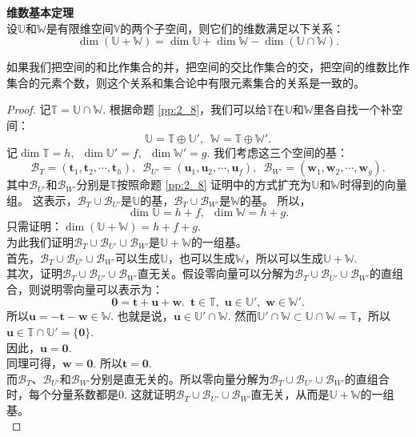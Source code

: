 \documentclass[12pt,UTF8]{ctexbook}
\begin{document}
\begin{pp}\textbf{维数基本定理}\label{pp:2_13}\\
    设$\mathbb{U}$和$\mathbb{W}$是有限维空间$\mathbb{V}$的两个子空间，则它们的维数满足以下关系：
    $$ \dim (\mathbb{U} + \mathbb{W}) = \dim \mathbb{U} + \dim \mathbb{W} - \dim (\mathbb{U} \cap \mathbb{W}).$$
\end{pp}
如果我们把空间的和比作集合的并，把空间的交比作集合的交，把空间的维数比作集合的元素个数，则这个关系和集合论中有限元素集合的关系是一致的。
\begin{proof} %
    记$\mathbb{T} = \mathbb{U} \cap \mathbb{W}$. 根据命题 \ref{pp:2_8}，我们可以给$\mathbb{T}$在$\mathbb{U}$和$\mathbb{W}$里各自找一个补空间：
    $$ \mathbb{U} = \mathbb{T} \oplus \mathbb{U}', \,\,\, \mathbb{W} = \mathbb{T} \oplus \mathbb{W}'.$$
    记$\dim \mathbb{T} = h, \,\,\, \dim \mathbb{U}' = f, \,\,\, \dim \mathbb{W}' = g$. 我们考虑这三个空间的基：
    $$ \mathcal{B}_T = (\mathbf{t}_1, \mathbf{t}_2, \cdots, \mathbf{t}_h), \,\,\, \mathcal{B}_{U'} = (\mathbf{u}_1, \mathbf{u}_2, \cdots, \mathbf{u}_f), \,\,\, \mathcal{B}_{W'} = (\mathbf{w}_1, \mathbf{w}_2, \cdots, \mathbf{w}_g). $$  
    其中$\mathcal{B}_{U'}$和$\mathcal{B}_{W'}$分别是$\mathbb{T}$按照命题 \ref{pp:2_8} 证明中的方式扩充为$\mathbb{U}$和$\mathbb{W}$时得到的向量组。
    这表示，$\mathcal{B}_T\cup\mathcal{B}_{U'}$是$\mathbb{U}$的基，$\mathcal{B}_T\cup\mathcal{B}_{W'}$是$\mathbb{W}$的基。
    所以，
    $$\dim \mathbb{U} = h + f,\,\,\,\dim \mathbb{W} = h + g.$$
    只需证明：$ \dim (\mathbb{U} + \mathbb{W}) = h + f + g.$\\
    为此我们证明$\mathcal{B}_T\cup\mathcal{B}_{U'}\cup\mathcal{B}_{W'}$是$\mathbb{U} + \mathbb{W}$的一组基。\\
    首先，$\mathcal{B}_T\cup\mathcal{B}_{U'}\cup\mathcal{B}_{W'}$可以生成$\mathbb{U}$，也可以生成$\mathbb{W}$，所以可以生成$\mathbb{U} + \mathbb{W}$.\\
    其次，证明$\mathcal{B}_T\cup\mathcal{B}_{U'}\cup\mathcal{B}_{W'}$直无关。假设零向量可以分解为$\mathcal{B}_T\cup\mathcal{B}_{U'}\cup\mathcal{B}_{W'}$的直组合，则说明零向量可以表示为：
    $$ \mathbf{0} = \mathbf{t} + \mathbf{u} + \mathbf{w}. \,\,\,\mathbf{t}\in\mathbb{T},\,\,\mathbf{u}\in\mathbb{U}',\,\,\mathbf{w}\in\mathbb{W}'.$$
    所以$\mathbf{u} = -\mathbf{t} - \mathbf{w} \in \mathbb{W}$.
    也就是说，$\mathbf{u}\in \mathbb{U}'\cap\mathbb{W}$.
    然而$\mathbb{U}'\cap\mathbb{W} \subset \mathbb{U}\cap\mathbb{W} = \mathbb{T}$，所以$\mathbf{u}\in\mathbb{T}\cap\mathbb{U}' = \{\mathbf{0}\}$.\\
    因此，$\mathbf{u} = \mathbf{0}.$\\
    同理可得，$\mathbf{w} = \mathbf{0}.$ 所以$\mathbf{t} = \mathbf{0}.$\\
    而$\mathcal{B}_T$、$\mathcal{B}_{U'}$和$\mathcal{B}_{W'}$分别是直无关的。所以零向量分解为$\mathcal{B}_T\cup\mathcal{B}_{U'}\cup\mathcal{B}_{W'}$的直组合时，每个分量系数都是0. 
    这就证明$\mathcal{B}_T\cup\mathcal{B}_{U'}\cup\mathcal{B}_{W'}$直无关，从而是$\mathbb{U} + \mathbb{W}$的一组基。\\
\end{proof}
\end{document}
